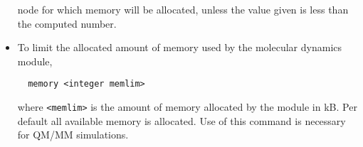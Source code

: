 \begin{itemize}
node for which memory will be allocated, unless the value given is
less than the computed number.
\item
To limit the allocated amount of memory used by the molecular dynamics
module,
\begin{verbatim}
  memory <integer memlim>
\end{verbatim}
where \verb+<memlim>+ is the amount of memory allocated by the module in
kB. Per default all available memory is allocated. Use of this command
is necessary for QM/MM simulations.
\end{itemize}





